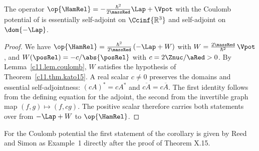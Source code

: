 \begin{fundament}
  \begin{corollary}\label{c11.cor.relativ}
    The operator $\op{\HamRel} = -\frac{\hbar^2}{2\massRed}\Lap + \Vpot$ with the Coulomb
    potential of  is essentially self-adjoint on $\Ccinf{\mathbb{R}^3}$ and
    self-adjoint on $\dom{-\Lap}$.
  \end{corollary}
  \begin{proof}
    We have $\op{\HamRel} = \frac{\hbar^2}{2\massRed}\,(-\Lap + W)$ with
    $W = \frac{2\massRed}{\hbar^2}\,\Vpot$, and $W(\posRel) = -c/\abs{\posRel}$ with
    $c = 2\Znuc/\aRed > 0$. By Lemma~\ref{c11.lem.coulomb}, $W$ satisfies the hypothesis
    of Theorem~\ref{c11.thm.kato15}. A real scalar $c \neq 0$ preserves the domains
    and essential self-adjointness: $(cA)^* = cA^*$ and
    $\overline{cA} = c\overline{A}$. The first identity follows from the defining
    equation for the adjoint, the second from the invertible graph map
    $(f,g) \mapsto (f,cg)$. The positive scalar therefore carries both statements
    over from $-\Lap + W$ to $\op{\HamRel}$.
  \end{proof}

  For the Coulomb potential the first statement of the corollary is given by Reed and
  Simon as Example~1 directly after the proof of Theorem X.15.


\end{fundament}
